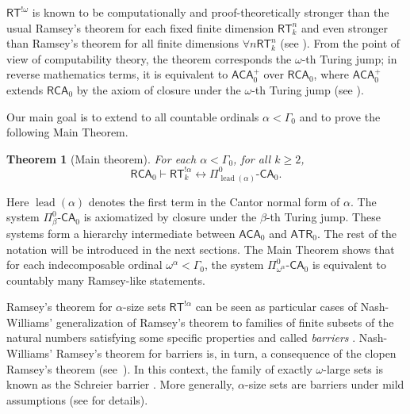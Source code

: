 \documentclass[11pt]{amsart}
\newtheorem{theorem}[thm]{Theorem}
\theoremstyle{definition}
\theoremstyle{remark}
\theoremstyle{plain}
\def\om{\omega}
\def\a{\alpha}
\def\b{\beta}
\def\G{\Gamma}
\newcommand{\RCA}{\mathsf{RCA}_0}
\newcommand{\ACA}{\mathsf{ACA}_0}
\newcommand{\ATR}{\mathsf{ATR}_0}
\newcommand{\RT}{\mathsf{RT}}
\newcommand{\lead}{\operatorname{lead}}
\newcommand{\CA}{\mathsf{\text{-}CA}_0}
\newcommand{\lorenzo}[1]{\textcolor{blue}{#1}}
\begin{document}
$\RT^{!\om}$ is known to be computationally and proof-theoretically stronger than the usual Ramsey's theorem for each fixed finite dimension $\RT^n_k$ and even stronger than Ramsey's theorem for all finite dimensions $\forall n \RT^n_k$ (see \cite{clote1984recursion}). 
From the point of view of computability theory, the theorem corresponds the $\omega$-th Turing jump; in reverse mathematics terms, it is equivalent to $\ACA^+$ over $\RCA$, where $\ACA^+$ extends $\RCA$ by the axiom of closure under the $\omega$-th Turing jump (see \cite{carlucci2014}).

Our main goal is to extend \cite{carlucci2014} to all countable ordinals $\alpha < \G_0$ and to prove the following Main Theorem.

\begin{theorem}[Main theorem]\label{thm:main}
For each $\a < \G_0$, for all $k\geq 2$,
$$\RCA \vdash \RT^{! \a}_k \leftrightarrow \Pi^0_{\lead(\alpha)} \CA.$$
\end{theorem}

Here $\lead(\a)$ denotes the first term in the Cantor normal form of $\a$.
The system $\Pi^0_{\b} \CA$ is axiomatized by closure under the $\b$-th Turing jump. 
These systems form a hierarchy intermediate between $\ACA$ and $\ATR$. 
The rest of the notation will be introduced in the next sections.
The Main Theorem shows that for each indecomposable ordinal $\om^\a < \G_0$, the system $\Pi^0_{\om^\a} \CA$ is equivalent to countably many Ramsey-like statements.


Ramsey's theorem for $\a$-size sets $\RT^{!\a}$ can be seen as particular cases of Nash-Williams' generalization of Ramsey's theorem to families of finite subsets of the natural numbers satisfying some specific properties and called {\em barriers} \cite{Todorcevic+2010}. 
Nash-Williams' Ramsey's theorem for barriers is, in turn, a consequence of the clopen Ramsey's theorem (see~\cite{simpson}).
In this context, the family of exactly $\omega$-large sets is known as the Schreier barrier \cite{Todorcevic+2010}. 
More generally, $\a$-size sets are barriers under mild assumptions (see \cite{marcone2025} for details). 
\end{document}
